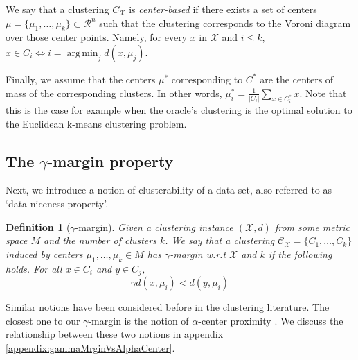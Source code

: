 \documentclass{article}
\newcommand{\mc}{\mathcal}
\DeclareMathOperator*{\argmin}{arg\,min}
\newtheorem{definition}[theorem]{Definition}
\begin{document}
We say that a clustering $C_{\mc X}$ is \emph{center-based} if there exists a set of centers $\mc \mu = \{\mu_1, \ldots, \mu_k\} \subset \mc R^n$ such that the clustering corresponds to the Voroni diagram over those center points. Namely, for every $x$ in $\mc X$ and $i \leq k$,  $x\in C_i \Leftrightarrow i=\argmin_j d(x,\mu_j)$. 







Finally, we assume that the centers $\mu^*$ corresponding to $C^*$ are the centers of mass of the corresponding clusters. In other words, $\mu^*_i=\frac{1}{|C_i|}\sum_{x\in C^*_i} x$. Note that this is the case for example when the oracle's clustering is the optimal solution to the Euclidean k-means clustering problem.

\subsection{The $\gamma$-margin property}
Next, we introduce a notion of clusterability of a data set, also referred to as `data niceness property'.

\begin{definition}[$\gamma$-margin]
\label{defn:alphacp}
Given a clustering instance $(\mc X, d)$ from some metric space $M$ and the number of clusters $k$. We say that a clustering $\mc C_{\mc X} = \{C_1, \ldots, C_k\}$ induced by centers $\mu_1, \ldots, \mu_k \in M$ has $\gamma$-margin w.r.t $\mc X$ and $k$ if the following holds. For all $x \in C_i$ and $y \in C_j$, 
$$\gamma d(x, \mu_i) < d(y, \mu_i)$$
\end{definition}

Similar notions have been considered before in the clustering literature. The closest one to our $\gamma$-margin is the notion of $\alpha$-center proximity \cite{balcan2012clustering,awasthi2012center}. We discuss the relationship between these two notions in appendix \ref{appendix:gammaMrginVsAlphaCenter}. 
\end{document}
